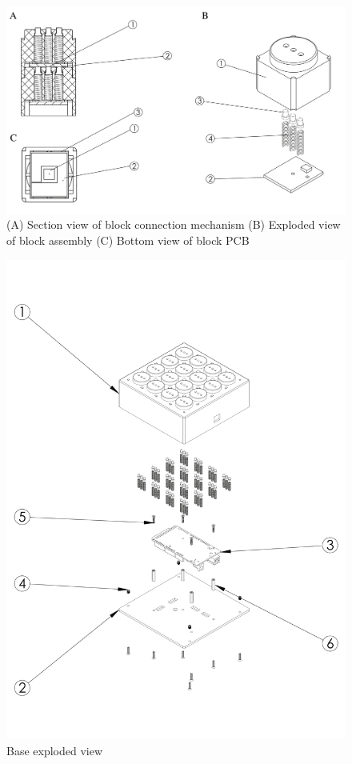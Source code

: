 \documentclass[]{article}
\begin{document}
\pagebreak
\begin{figure}
	\includegraphics[width=\textwidth]{Figures/single_block}
	\caption{(A) Section view of block connection mechanism (B) Exploded view of block assembly (C) Bottom view of block PCB}
	\label{fig:block}
\end{figure}


\begin{figure}[H]
	\includegraphics[width=\textwidth]{Figures/base}
	\caption{Base exploded view}
\end{figure}
\end{document}
